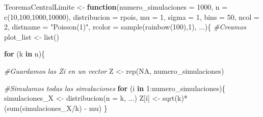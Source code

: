\documentclass[
]{book}
\newenvironment{Shaded}{\begin{snugshade}}{\end{snugshade}}
\newcommand{\AttributeTok}[1]{\textcolor[rgb]{0.77,0.63,0.00}{#1}}
\newcommand{\CommentTok}[1]{\textcolor[rgb]{0.56,0.35,0.01}{\textit{#1}}}
\newcommand{\ConstantTok}[1]{\textcolor[rgb]{0.00,0.00,0.00}{#1}}
\newcommand{\ControlFlowTok}[1]{\textcolor[rgb]{0.13,0.29,0.53}{\textbf{#1}}}
\newcommand{\DecValTok}[1]{\textcolor[rgb]{0.00,0.00,0.81}{#1}}
\newcommand{\FunctionTok}[1]{\textcolor[rgb]{0.00,0.00,0.00}{#1}}
\newcommand{\NormalTok}[1]{#1}
\newcommand{\OtherTok}[1]{\textcolor[rgb]{0.56,0.35,0.01}{#1}}
\newcommand{\SpecialCharTok}[1]{\textcolor[rgb]{0.00,0.00,0.00}{#1}}
\newcommand{\StringTok}[1]{\textcolor[rgb]{0.31,0.60,0.02}{#1}}
\begin{document}
\begin{Shaded}
\begin{Highlighting}[]
\NormalTok{TeoremaCentralLimite }\OtherTok{\textless{}{-}} \ControlFlowTok{function}\NormalTok{(}\AttributeTok{numero\_simulaciones =} \DecValTok{1000}\NormalTok{, }
                                 \AttributeTok{n =} \FunctionTok{c}\NormalTok{(}\DecValTok{10}\NormalTok{,}\DecValTok{100}\NormalTok{,}\DecValTok{1000}\NormalTok{,}\DecValTok{10000}\NormalTok{), }
                                 \AttributeTok{distribucion =}\NormalTok{ rpois, }\AttributeTok{mu =} \DecValTok{1}\NormalTok{, }\AttributeTok{sigma =} \DecValTok{1}\NormalTok{, }
                                 \AttributeTok{bins =} \DecValTok{50}\NormalTok{, }
                                 \AttributeTok{ncol =} \DecValTok{2}\NormalTok{, }\AttributeTok{distname =} \StringTok{"Poisson(1)"}\NormalTok{, }
                                 \AttributeTok{rcolor =} \FunctionTok{sample}\NormalTok{(}\FunctionTok{rainbow}\NormalTok{(}\DecValTok{100}\NormalTok{),}\DecValTok{1}\NormalTok{), ...)\{}
  \CommentTok{\#Creamos}
\NormalTok{  plot\_list }\OtherTok{\textless{}{-}} \FunctionTok{list}\NormalTok{()}
  
  \ControlFlowTok{for}\NormalTok{ (k }\ControlFlowTok{in}\NormalTok{ n)\{}
    
    \CommentTok{\#Guardamos las Zi en un vector}
\NormalTok{    Z }\OtherTok{\textless{}{-}} \FunctionTok{rep}\NormalTok{(}\ConstantTok{NA}\NormalTok{, numero\_simulaciones)}
    
    \CommentTok{\#Simulamos todas las simulaciones}
    \ControlFlowTok{for}\NormalTok{ (i }\ControlFlowTok{in} \DecValTok{1}\SpecialCharTok{:}\NormalTok{numero\_simulaciones)\{}
\NormalTok{      simulaciones\_X }\OtherTok{\textless{}{-}} \FunctionTok{distribucion}\NormalTok{(}\AttributeTok{n =}\NormalTok{ k, ...)}
\NormalTok{      Z[i]         }\OtherTok{\textless{}{-}} \FunctionTok{sqrt}\NormalTok{(k)}\SpecialCharTok{*}\NormalTok{(}\FunctionTok{sum}\NormalTok{(simulaciones\_X}\SpecialCharTok{/}\NormalTok{k) }\SpecialCharTok{{-}}\NormalTok{ mu)}
\NormalTok{    \}}
    

\end{Highlighting}
\end{Shaded}
\end{document}
